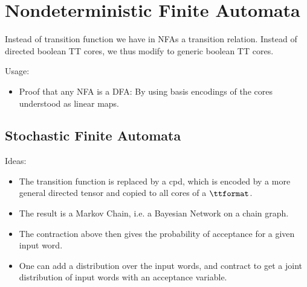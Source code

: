 \section{Nondeterministic Finite Automata}

Instead of transition function we have in NFAs a transition relation.
Instead of directed boolean TT cores, we thus modify to generic boolean TT cores.

Usage:
\begin{itemize}
    \item Proof that any NFA is a DFA: By using basis encodings of the cores understood as linear maps.
\end{itemize}

\subsection{Stochastic Finite Automata}

Ideas:
\begin{itemize}
    \item The transition function is replaced by a cpd, which is encoded by a more general directed tensor and copied to all cores of a $\ttformat$.
    \item The result is a Markov Chain, i.e. a Bayesian Network on a chain graph.
    \item The contraction above then gives the probability of acceptance for a given input word.
    \item One can add a distribution over the input words, and contract to get a joint distribution of input words with an acceptance variable.
\end{itemize}
